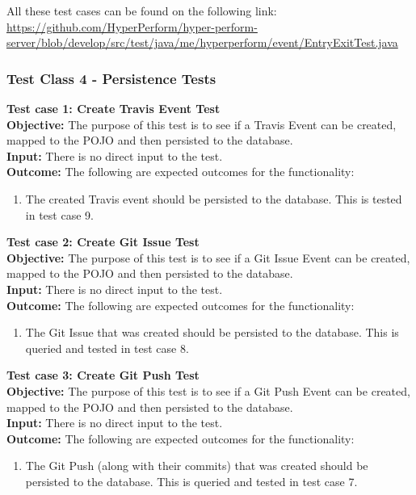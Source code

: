 \documentclass[11pt,a4paper]{article}
\begin{document}
All these test cases can be found on the following link:
\url{https://github.com/HyperPerform/hyper-perform-server/blob/develop/src/test/java/me/hyperperform/event/EntryExitTest.java}

\subsubsection{Test Class 4 - Persistence Tests}	
\textbf{Test case 1: Create Travis Event Test} \\
\textbf{Objective: } The purpose of this test is to see if a Travis Event can be created, mapped to the POJO and then persisted to the database. \\
\textbf{Input: } There is no direct input to the test. \\
\textbf{Outcome: } The following are expected outcomes for the functionality: 
\begin{enumerate}
	\item The created Travis event should be persisted to the database. This is tested in test case 9.\\
\end{enumerate}
\noindent
\textbf{Test case 2: Create Git Issue Test} \\
\textbf{Objective: } The purpose of this test is to see if a Git Issue Event can be created, mapped to the POJO and then persisted to the database. \\
\textbf{Input: } There is no direct input to the test. \\
\textbf{Outcome: } The following are expected outcomes for the functionality: 
\begin{enumerate}
	\item The Git Issue that was created should be persisted to the database. This is queried and tested in test case 8.\\
\end{enumerate}
\noindent
\textbf{Test case 3: Create Git Push Test} \\
\textbf{Objective: } The purpose of this test is to see if a Git Push Event can be created, mapped to the POJO and then persisted to the database. \\
\textbf{Input: } There is no direct input to the test. \\
\textbf{Outcome: } The following are expected outcomes for the functionality: 
\begin{enumerate}
	\item The Git Push (along with their commits) that was created should be persisted to the database. This is queried and tested in test case 7.\\
\end{enumerate}
\end{document}
